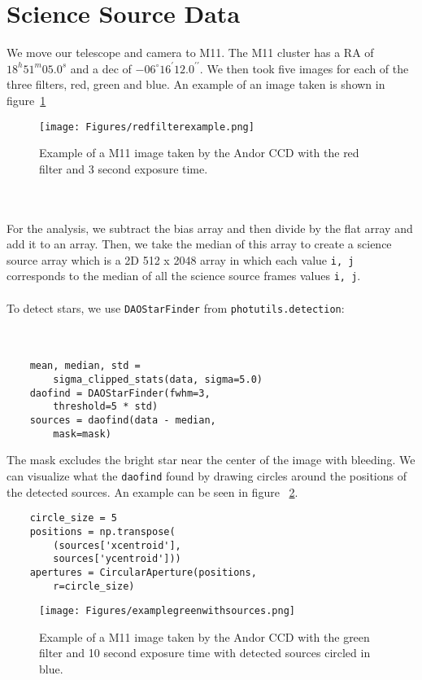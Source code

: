 \documentclass[twocolumn]{article}
\begin{document}
\section{Science Source Data}
We move our telescope and camera to M11. The M11 cluster has a RA of $18^h51^m05.0^s$ and a dec of $-06^{\circ}16^{\prime}12.0^{\prime\prime}$. We then took five images for each of the three filters, red, green and blue. An example of an image taken is shown in figure~\ref{fig:redex} 
\begin{figure}[h!]
    \texttt{[image: Figures/redfilterexample.png]}
    \caption{Example of a M11 image taken by the Andor CCD with the red filter and 3 second exposure time.}
    \label{fig:redex}
\end{figure}
\\
\\
For the analysis, we subtract the bias array and then divide by the flat array and add it to an array. Then, we take the median of this array to create a science source array which is a 2D 512 x 2048 array in which each value \verb|i, j| corresponds to the median of all the science source frames values \verb|i, j|. 
\\
\\
To detect stars, we use \verb|DAOStarFinder| from \verb|photutils.detection|: 
\\
\\
\\
\begin{verbatim}
    mean, median, std = 
        sigma_clipped_stats(data, sigma=5.0)
    daofind = DAOStarFinder(fwhm=3,
        threshold=5 * std)
    sources = daofind(data - median, 
        mask=mask)
\end{verbatim}
The mask excludes the bright star near the center of the image with bleeding. We can visualize what the \verb|daofind| found by drawing circles around the positions of the detected sources. An example can be seen in figure ~\ref{fig:greenex}.
\begin{verbatim}
    circle_size = 5
    positions = np.transpose(
        (sources['xcentroid'], 
        sources['ycentroid']))
    apertures = CircularAperture(positions, 
        r=circle_size)
\end{verbatim}
\begin{figure}[h!]
    \texttt{[image: Figures/examplegreenwithsources.png]}
    \caption{Example of a M11 image taken by the Andor CCD with the green filter and 10 second exposure time with detected sources circled in blue.}
    \label{fig:greenex}
\end{figure}
\end{document}

